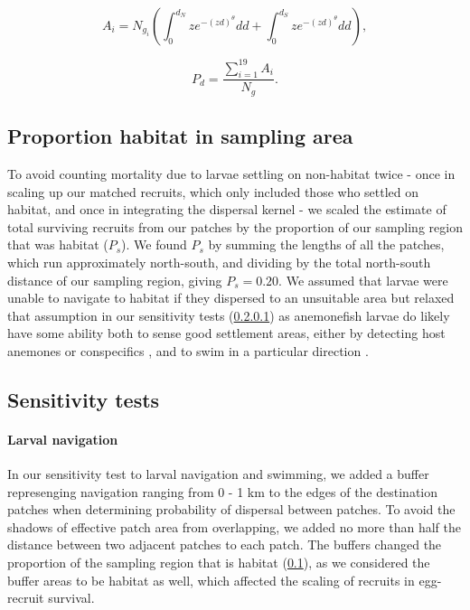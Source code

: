 \documentclass[12pt, oneside]{article}   	%
\begin{document}
\begin{equation} 
A_i = N_{g_i} \left( \int_{0}^{d_N} z e^{-(zd)^\theta}  dd + \int_{0}^{d_S} z e^{-(zd)^\theta}  dd \right), \label{EQN_DK_area_within_sampling_region}
\end{equation}

\begin{equation}
P_d = \frac{\sum_{i=1}^{19} A_i}{N_g}.
\end{equation}

\subsection{Proportion habitat in sampling area} \label{APP_SEC_PropHabInSampledRegion}

To avoid counting mortality due to larvae settling on non-habitat twice - once in scaling up our matched recruits, which only included those who settled on habitat, and once in integrating the dispersal kernel - we scaled the estimate of total surviving recruits from our patches by the proportion of our sampling region that was habitat ($P_s$). We found $P_s$ by summing the lengths of all the patches, which run approximately north-south, and dividing by the total north-south distance of our sampling region, giving $P_s = 0.20$. We assumed that larvae were unable to navigate to habitat if they dispersed to an unsuitable area but relaxed that assumption in our sensitivity tests (\ref{APP_SEC_METHODS_Larval_nav}) as anemonefish larvae do likely have some ability both to sense good settlement areas, either by detecting host anemones \citep{elliott1995host, arvedlund1999host} or conspecifics \citep[e.g.][for coral reef fish more broadly]{lecchini2005experimental}, and to swim in a particular direction \citep[e.g.][]{bellwood2001relative, fisher2005swimming}.

\subsection{Sensitivity tests}

\paragraph{Larval navigation} \label{APP_SEC_METHODS_Larval_nav}

In our sensitivity test to larval navigation and swimming, we added a buffer represenging navigation ranging from 0 - 1 km to the edges of the destination patches when determining probability of dispersal between patches. To avoid the shadows of effective patch area from overlapping, we added no more than half the distance between two adjacent patches to each patch. The buffers changed the proportion of the sampling region that is habitat (\ref{APP_SEC_PropHabInSampledRegion}), as we considered the buffer areas to be habitat as well, which affected the scaling of recruits in egg-recruit survival.
\end{document}
